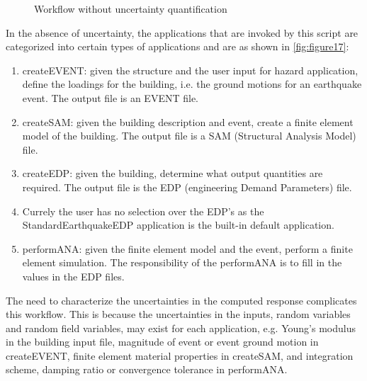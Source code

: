 \begin{figure}[!htbp]
  \caption{Workflow without uncertainty quantification}
  \label{fig:figure17}
\end{figure}


In the absence of uncertainty, the applications that are invoked by
this script are categorized into certain types of applications and are
as shown in \autoref{fig:figure17}:
\begin{enumerate}
\item createEVENT: given the structure and the user input for hazard
  application, define the loadings for the building, i.e. the ground
  motions for an earthquake event. The output file is an EVENT file.
\item createSAM: given the building description and event, create a
  finite element model of the building. The output file is a SAM
  (Structural Analysis Model) file.
\item createEDP: given the building, determine what output quantities
  are required. The output file is the EDP (engineering Demand
  Parameters) file.
\item Currely the user has no selection over the EDP’s as the
  StandardEarthquakeEDP application is the built-in default
  application.
\item performANA: given the finite element model and the event,
  perform a finite element simulation. The responsibility of the
  performANA is to fill in the values in the EDP files.
\end{enumerate}


The need to characterize the uncertainties in the computed response
complicates this workflow. This is because the uncertainties in the
inputs, random variables and random field variables, may exist for
each application, e.g. Young’s modulus in the building input file,
magnitude of event or event ground motion in createEVENT, finite
element material properties in createSAM, and integration scheme,
damping ratio or convergence tolerance in performANA.

